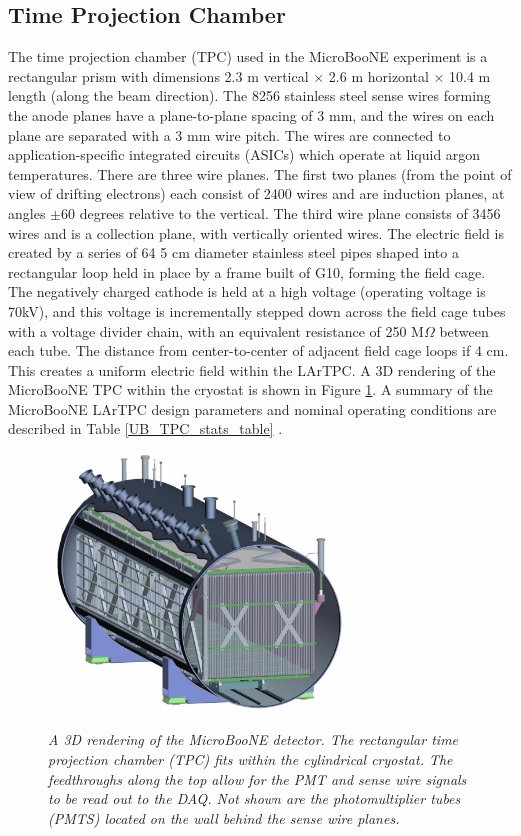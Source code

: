 \subsection{Time Projection Chamber}
The time projection chamber (TPC) used in the MicroBooNE experiment is a rectangular prism with dimensions 2.3 m vertical $\times$ 2.6 m horizontal $\times$ 10.4 m length (along the beam direction). The 8256 stainless steel sense wires forming the anode planes have a plane-to-plane spacing of 3 mm, and the wires on each plane are separated with a 3 mm wire pitch. The wires are connected to application-specific integrated circuits (ASICs) which operate at liquid argon temperatures. There are three wire planes. The first two planes (from the point of view of drifting electrons) each consist of 2400 wires and are induction planes, at angles $\pm60$ degrees relative to the vertical. The third wire plane consists of 3456 wires and is a collection plane, with vertically oriented wires. The electric field is created by a series of 64 5 cm diameter stainless steel pipes shaped into a rectangular loop held in place by a frame built of G10, forming the field cage. The negatively charged cathode is held at a high voltage (operating voltage is 70kV), and this voltage is incrementally stepped down across the field cage tubes with a voltage divider chain, with an equivalent resistance of 250 M$\Omega$ between each tube. The distance from center-to-center of adjacent field cage loops if 4 cm. This creates a uniform electric field within the LArTPC. A 3D rendering of the MicroBooNE TPC within the cryostat is shown in Figure \ref{cryo_3D_rendering_fig}. A summary of the MicroBooNE LArTPC design parameters and nominal operating conditions are described in Table \ref{UB_TPC_stats_table} \cite{UBDetectorPaper}.


\begin{figure}[ht!]
\centering
	\includegraphics[width=0.7\textwidth]{Figures/cryo_3D_rendering.png} \\
\caption{\textit{A 3D rendering of the MicroBooNE detector. The rectangular time projection chamber (TPC) fits within the cylindrical cryostat. The feedthroughs along the top allow for the PMT and sense wire signals to be read out to the DAQ. Not shown are the photomultiplier tubes (PMTS) located on the wall behind the sense wire planes.}}\label{cryo_3D_rendering_fig}
\end{figure}


